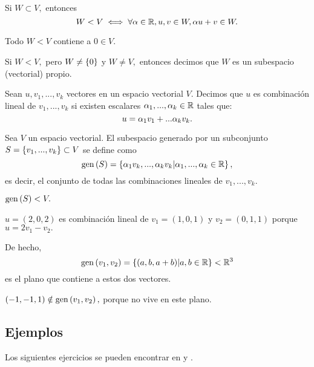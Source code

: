 \begin{prop}
 Si $W\subset V,$ entonces $$
W < V \iff \forall \alpha \in \mathbb{R}, u,v \in W, \alpha u+v\in W.
 $$
\end{prop}

\begin{cor}
 Todo $W < V$ contiene a $0 \in V.$
\end{cor}


\begin{defn}
 Si $W< V,$ pero $W\neq\left\{ 0 \right\}$ y $W\neq V,$ entonces decimos que $W$ es un subespacio (vectorial) propio.
\end{defn}

\begin{defn}
 Sean $u,v_{1},...,v_{k}$ vectores en un espacio vectorial $V.$ Decimos que $u$ es combinaci\'on lineal de
$v_{1},...,v_{k}$ si existen escalares $\alpha_{1},...,\alpha_{k}\in \mathbb{R}$ tales que:
$$
u=\alpha_{1}v_{1}+...\alpha_{k}v_{k}.
$$
\end{defn}

\begin{defn}
 Sea $V$ un espacio vectorial. El subespacio generado por un subconjunto $S=\left\{ v_{1},...,v_{k} \right\}\subset V$ se define
como
 $$
\operatorname{gen}\left( S \right)=\left\{ \alpha_{1}v_{k},...,\alpha_{k}v_{k}\arrowvert \alpha_{1},...,\alpha_{k}\in \mathbb{R} \right\},
 $$
 es decir, el conjunto de todas las combinaciones lineales de $v_{1},...,v_{k}.$
\end{defn}

\begin{rem}
 $\operatorname{gen}\left( S \right)<V.$
\end{rem}


\begin{problema}
 $u=(2,0,2)$ es combinaci\'on lineal de $v_{1}=(1,0,1)$ y $v_{2}=(0,1,1)$ porque $u=2v_{1}-v_{2}.$

 De hecho, $$\operatorname{gen}\left( v_{1},v_{2} \right)=\left\{ (a,b,a+b)\arrowvert a,b \in \mathbb{R} \right\}<\mathbb{R}^{3}$$ es el plano que contiene a estos dos vectores.

 $(-1,-1,1)\notin \operatorname{gen}\left( v_{1},v_{2} \right),$ porque no vive en este plano.
\end{problema}





\subsection*{Ejemplos}

Los siguientes ejercicios se pueden encontrar en \cite[sec. 4.3]{G} y \cite[sec. 2.2]{HK}.

